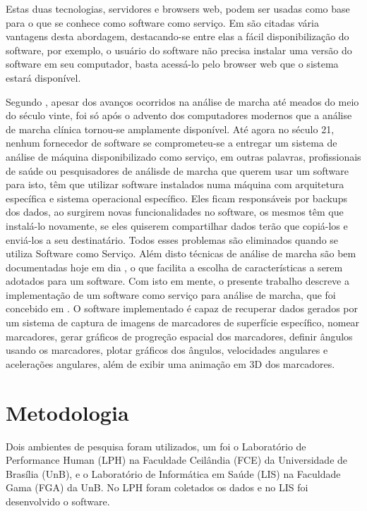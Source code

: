 \documentclass[journal]{IEEEtran}
\begin{document}
Estas duas tecnologias, servidores e browsers web, podem ser 
usadas como base para o que se conhece como software como serviço. 
Em \cite{Fox2012} são citadas vária vantagens desta abordagem, 
destacando-se entre elas a fácil disponibilização do software,
por exemplo, o usuário do software não precisa instalar uma 
versão do software em seu computador, basta acessá-lo pelo
browser web que o sistema estará disponível.

Segundo \cite{Baker2007}, apesar dos avanços ocorridos na análise de marcha 
até meados do meio do século
vinte, foi só após o advento dos computadores modernos 
que a análise de marcha clínica
tornou-se amplamente disponível. 
Até agora no século 21, nenhum fornecedor de software se comprometeu-se
a
entregar um sistema de análise de máquina disponibilizado como serviço,
em outras palavras, profissionais de saúde ou pesquisadores de análisde de marcha
que querem usar um software para isto, têm que utilizar software instalados
numa máquina com arquitetura específica e sistema operacional específico. 
Eles ficam responsáveis por backups dos dados,
ao surgirem novas funcionalidades no software, os mesmos têm que instalá-lo
novamente, se eles quiserem compartilhar dados terão que copiá-los e enviá-los
a seu destinatário. 
Todos esses problemas são eliminados quando se utiliza Software como Serviço.
Além disto técnicas de análise de marcha são bem documentadas hoje em dia
\cite{Perry2010}, o que facilita a escolha de características a serem adotados
para um software.
Com isto em mente, o presente trabalho descreve a implementação
de um software como serviço para análise de marcha, que foi
concebido em \cite{Lima2015}. 
O software implementado é capaz de recuperar dados gerados por um sistema de
captura de imagens de marcadores de superfície específico, 
nomear marcadores,
gerar gráficos de progreção espacial dos marcadores, 
definir ângulos usando os marcadores, plotar gráficos dos ângulos, 
velocidades angulares e acelerações angulares, além de exibir uma animação
em 3D dos marcadores.




\section{Metodologia}
Dois ambientes de pesquisa foram utilizados, um foi o Laboratório de 
Performance Human (LPH) na Faculdade Ceilândia (FCE) 
da Universidade de Brasília (UnB), e o Laboratório de Informática em Saúde
(LIS) na Faculdade Gama (FGA) da UnB.
No LPH foram coletados os dados e no LIS foi desenvolvido o software.
\end{document}
